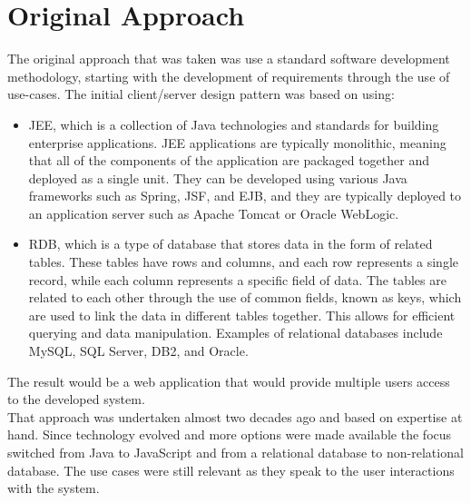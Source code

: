 \section{Original Approach}
The original approach that was taken was use a standard software development methodology, starting with the development of requirements through the use of use-cases. The initial client/server design pattern was based on using:
\begin{itemize}
\item \ac{JEE}, which is a collection of Java technologies and standards for building enterprise applications. \ac{JEE} applications are typically monolithic, meaning that all of the components of the application are packaged together and deployed as a single unit. They can be developed using various Java frameworks such as Spring, \ac{JSF}, and \ac{EJB}, and they are typically deployed to an application server such as Apache Tomcat or Oracle WebLogic.
\item \ac{RDB}, which is a type of database that stores data in the form of related tables. These tables have rows and columns, and each row represents a single record, while each column represents a specific field of data. The tables are related to each other through the use of common fields, known as keys, which are used to link the data in different tables together. This allows for efficient querying and data manipulation. Examples of relational databases include MySQL, SQL Server, DB2, and Oracle.
\end{itemize}
The result would be a web application that would provide multiple users access to the developed system.\vspace{5mm} \\
That approach was undertaken almost two decades ago and based on expertise at hand. Since technology evolved and more options were made available the focus switched from Java to JavaScript and from a relational database to non-relational database. The use cases were still relevant as they speak to the user interactions with the system.
